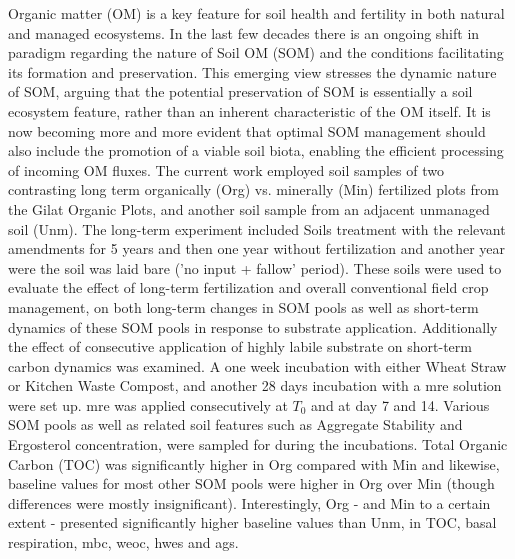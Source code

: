 	Organic matter (OM) is a key feature for soil health and fertility in both natural and managed ecosystems. In the last few decades there is an ongoing shift in paradigm regarding the nature of Soil OM (SOM) and the conditions facilitating its formation and preservation. This emerging view stresses the dynamic nature of SOM, arguing that the potential preservation of SOM is essentially a soil ecosystem feature, rather than an inherent characteristic of the OM itself. It is now becoming more and more evident that optimal SOM management should also include the promotion of a viable soil biota, enabling the efficient processing of incoming OM fluxes. The current work employed soil samples of two contrasting long term organically (Org) vs. minerally (Min) fertilized plots from  the Gilat Organic Plots, and another soil sample from an adjacent unmanaged soil (Unm). The long-term experiment included Soils treatment with the relevant amendments for 5 years and then one year without fertilization and another year were the soil was laid bare ('no input + fallow' period). These soils were used to evaluate the effect of long-term fertilization and overall conventional field crop management, on both long-term changes in SOM pools as well as short-term dynamics of these SOM pools in response to substrate application. Additionally the effect of consecutive application of highly labile substrate on short-term carbon dynamics was examined. 
	A one week incubation with either Wheat Straw or Kitchen Waste Compost, and another 28 days incubation with a \gls{mre} solution were set up. \gls{mre} was applied consecutively at $ T_0 $ and at day 7 and 14. Various SOM pools as well as related soil features such as Aggregate Stability and Ergosterol concentration, were sampled for during the incubations.  
	Total Organic Carbon (TOC) was significantly higher in Org compared with Min and likewise, baseline values  for most other SOM pools were higher in Org over Min (though differences were mostly insignificant). Interestingly, Org - and Min to a certain extent - presented significantly higher baseline values than Unm, in TOC, basal respiration, \gls{mbc}, \gls{weoc}, \gls{hwes} and \gls{ags}. 
